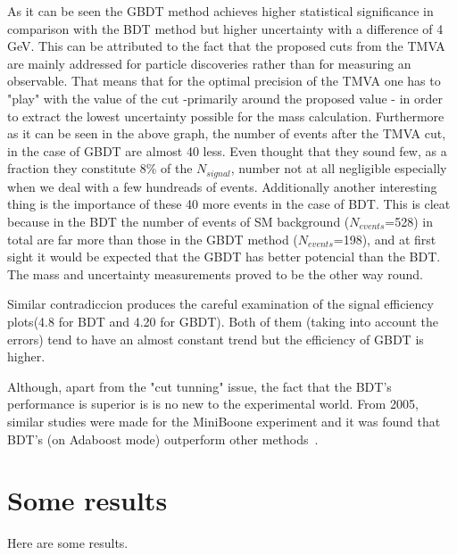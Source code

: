 \documentclass[12pt,a4paper]{report}
\begin{document}
As it can be seen the GBDT method achieves higher statistical significance in comparison with the BDT method
but higher uncertainty with a difference of 4 GeV. This can be attributed to the fact that the proposed cuts 
from the TMVA are mainly addressed for particle discoveries rather than for measuring an observable. That 
means that for the optimal precision of the TMVA one has to "play" with the value of the cut -primarily
around the proposed value - in order to extract the lowest uncertainty possible for the mass calculation.
Furthermore as it can be seen in the above graph, the number of events after the TMVA cut, in the case of 
GBDT are almost 40 less. Even thought that they sound few, as a fraction they constitute 8$\%$ of the
$N_{signal}$,
number not at all negligible especially when we deal with a few hundreads of events.
Additionally another interesting thing is the importance of these 40 more events in the case of BDT.
This is cleat because in the BDT the number of events of SM background ($N_{events}$=528) 
in total are far more 
than those in the GBDT method ($N_{events}$=198), and at first sight it would be expected that the GBDT has 
better potencial than the BDT. The mass and uncertainty measurements proved to be the other way round.

Similar contradiccion produces the careful examination of the signal efficiency plots(4.8 for BDT and 4.20
for GBDT). Both of them (taking into account the errors) tend to have an almost constant trend but the 
efficiency of GBDT is higher.

Although, apart from the "cut tunning" issue, the fact that the BDT's performance is superior is is no 
new to the experimental world. From 2005, similar studies were made for the MiniBoone experiment and 
it was found that BDT's (on Adaboost mode) outperform other methods~\cite{yang2005studies}.






























\section{Some results}
Here are some results.
\end{document}
